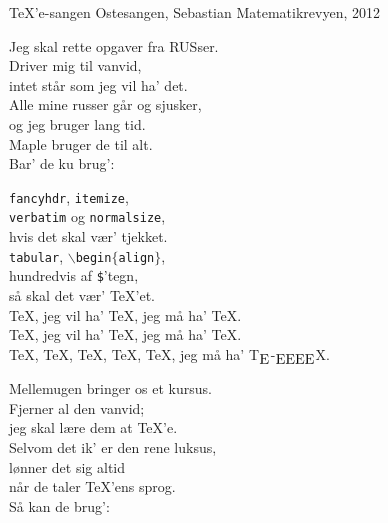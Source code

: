 \begin{song}{\TeX'e-sangen}
  {} %
  {Ostesangen, Sebastian} %
  {} %
  {Matematikrevyen, 2012} %
  {\NotCCLIed} %

  \begin{SBVerse}
Jeg skal rette opgaver fra RUSser.\\
Driver mig til vanvid,\\
intet står som jeg vil ha' det.\\
Alle mine russer går og sjusker,\\
og jeg bruger lang tid.\\
Maple bruger de til alt.\\
Bar' de ku brug':
  \end{SBVerse}

  \begin{SBChorus}
\texttt{fancyhdr}, \texttt{itemize},\\
\texttt{verbatim} og \texttt{normalsize},\\
hvis det skal vær' tjekket.\\
\texttt{tabular}, \texttt{$\backslash$begin$\{$align$\}$},\\
hundredvis af \texttt{\$}'tegn,\\
så skal det vær' \TeX'et.\\
\TeX, jeg vil ha' \TeX, jeg må ha' \TeX.\\
\TeX, jeg vil ha' \TeX, jeg må ha' \TeX.\\
\TeX, \TeX, \TeX, \TeX, \TeX, jeg må ha' T\!$_{\text{\normalsize E}}$-$_{\text{\normalsize EEEE}}$\!X.
  \end{SBChorus}

  \begin{SBVerse}
Mellemugen bringer os et kursus.\\
Fjerner al den vanvid;\\
jeg skal lære dem at \TeX'e.\\
Selvom det ik' er den rene luksus,\\
lønner det sig altid\\
når de taler \TeX'ens sprog.\\
Så kan de brug':
  \end{SBVerse}


\end{song}
